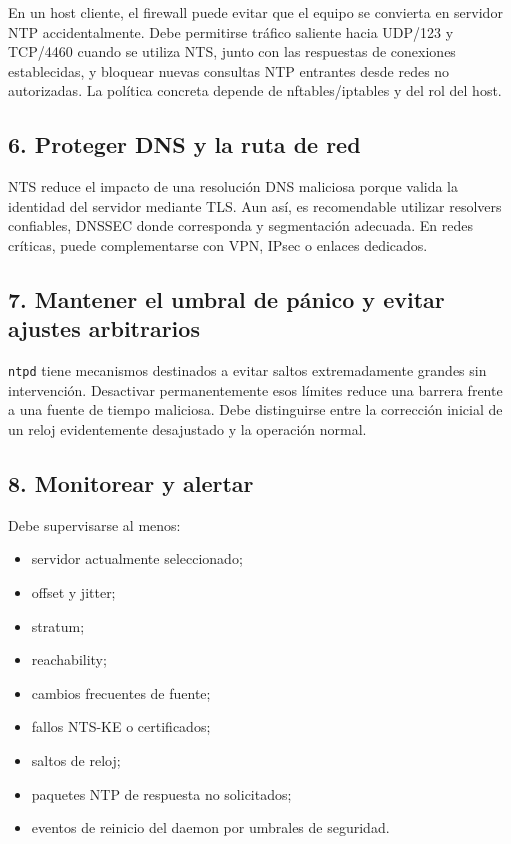 \documentclass[11pt,a4paper]{article}
\begin{document}
En un host cliente, el firewall puede evitar que el equipo se convierta en servidor NTP accidentalmente. Debe permitirse tráfico saliente hacia UDP/123 y TCP/4460 cuando se utiliza NTS, junto con las respuestas de conexiones establecidas, y bloquear nuevas consultas NTP entrantes desde redes no autorizadas. La política concreta depende de nftables/iptables y del rol del host.

\subsection{6. Proteger DNS y la ruta de red}

NTS reduce el impacto de una resolución DNS maliciosa porque valida la identidad del servidor mediante TLS. Aun así, es recomendable utilizar resolvers confiables, DNSSEC donde corresponda y segmentación adecuada. En redes críticas, puede complementarse con VPN, IPsec o enlaces dedicados.

\subsection{7. Mantener el umbral de pánico y evitar ajustes arbitrarios}

\texttt{ntpd} tiene mecanismos destinados a evitar saltos extremadamente grandes sin intervención. Desactivar permanentemente esos límites reduce una barrera frente a una fuente de tiempo maliciosa. Debe distinguirse entre la corrección inicial de un reloj evidentemente desajustado y la operación normal.

\subsection{8. Monitorear y alertar}

Debe supervisarse al menos:

\begin{itemize}
    \item servidor actualmente seleccionado;
    \item offset y jitter;
    \item stratum;
    \item reachability;
    \item cambios frecuentes de fuente;
    \item fallos NTS-KE o certificados;
    \item saltos de reloj;
    \item paquetes NTP de respuesta no solicitados;
    \item eventos de reinicio del daemon por umbrales de seguridad.
\end{itemize}
\end{document}
